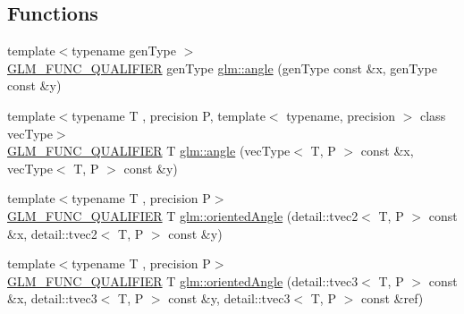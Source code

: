 \subsection*{Functions}
\begin{DoxyCompactItemize}
\item 
{\footnotesize template$<$typename gen\+Type $>$ }\\\hyperlink{setup_8hpp_a33fdea6f91c5f834105f7415e2a64407}{G\+L\+M\+\_\+\+F\+U\+N\+C\+\_\+\+Q\+U\+A\+L\+I\+F\+I\+ER} gen\+Type \hyperlink{namespaceglm_a0634619b62db66fe6a4bd04da1feabea}{glm\+::angle} (gen\+Type const \&x, gen\+Type const \&y)
\item 
{\footnotesize template$<$typename T , precision P, template$<$ typename, precision $>$ class vec\+Type$>$ }\\\hyperlink{setup_8hpp_a33fdea6f91c5f834105f7415e2a64407}{G\+L\+M\+\_\+\+F\+U\+N\+C\+\_\+\+Q\+U\+A\+L\+I\+F\+I\+ER} T \hyperlink{namespaceglm_a8501bc310fa98bb40bec1b3c285183f1}{glm\+::angle} (vec\+Type$<$ T, P $>$ const \&x, vec\+Type$<$ T, P $>$ const \&y)
\item 
{\footnotesize template$<$typename T , precision P$>$ }\\\hyperlink{setup_8hpp_a33fdea6f91c5f834105f7415e2a64407}{G\+L\+M\+\_\+\+F\+U\+N\+C\+\_\+\+Q\+U\+A\+L\+I\+F\+I\+ER} T \hyperlink{group__gtx__vector__angle_ga6f9cbae1b02b49ad92a1d0070649f038}{glm\+::oriented\+Angle} (detail\+::tvec2$<$ T, P $>$ const \&x, detail\+::tvec2$<$ T, P $>$ const \&y)
\item 
{\footnotesize template$<$typename T , precision P$>$ }\\\hyperlink{setup_8hpp_a33fdea6f91c5f834105f7415e2a64407}{G\+L\+M\+\_\+\+F\+U\+N\+C\+\_\+\+Q\+U\+A\+L\+I\+F\+I\+ER} T \hyperlink{group__gtx__vector__angle_ga2aefc221dd5ed9fdacc17c28eea76775}{glm\+::oriented\+Angle} (detail\+::tvec3$<$ T, P $>$ const \&x, detail\+::tvec3$<$ T, P $>$ const \&y, detail\+::tvec3$<$ T, P $>$ const \&ref)
\end{DoxyCompactItemize}
